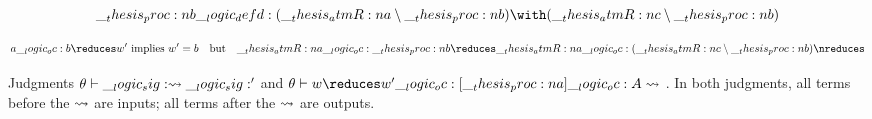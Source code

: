 \begin{equation*}
  \proc{b} \defd (\atmR{a} \limp \proc{b}) \with (\atmR{c} \limp \proc{b})
\end{equation*}

\begin{equation*}
  a \oc b \reduces w' \text{ implies $w' = b$}
  \quad\text{but}\quad
  \atmR{a} \oc \proc{b} \reduces \atmR{a} \oc (\atmR{c} \limp \proc{b}) \nreduces
\end{equation*}

\autocite{McDowell+:TCS03}


Judgments $\theta \vdash \__logic_sig: \rightsquigarrow \__logic_sig:'$ and $\chorax{\theta}{w \reduces w'}{\proc{a}}{A}$.
In both judgments, all terms before the $\rightsquigarrow$ are inputs; all terms after the $\rightsquigarrow$ are outputs.



